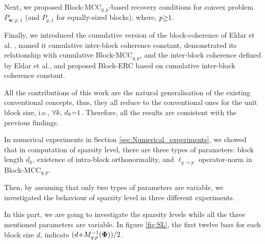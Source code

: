 Next, we proposed Block-MCC$_{q,p}$-based recovery conditions for convex problem $P_{\boldsymbol{w};p,1}$ (and $P_{p,1}$ for equally-sized blocks), where, $p {\geq} 1$.


Finally, we introduced the cumulative version of the block-coherence of Eldar et al. \cite{Eldar2009b}, 
named it cumulative inter-block coherence constant, 
demonstrated its relationship with cumulative Block-MCC$_{q,p}$, and 
the inter-block coherence defined by Eldar et al., 
and proposed Block-ERC based on cumulative inter-block coherence constant.

All the contributions of this work are the natural generalisation of the existing conventional concepts, thus, they all reduce to the conventional ones for the unit block size, i.e., $\forall k, \, d_k {=} 1$.
Therefore, all the results are consistent with the previous findings.

In numerical experiments in Section \ref{sec:Numerical_experiments}, we showed that in computation of sparsity level, there are three types of parameters: block length $d_k$, existence of intra-block orthonormality, and $\ell_{q {\to} p}$ operator-norm in Block-MCC$_{q,p}$.

Then, by assuming that only two types of parameters are variable, we investigated the behaviour of sparsity level in three different experiments.

In this part, we are going to investigate the sparsity levels while all the three mentioned parameters are variable.
In figure \ref{fig:SL}, the first twelve bars for each block size $d$, indicate $(d {+} M^{-1}_{q,p}(\boldsymbol{\Phi}))/2$.
\iffalse 
for the most pessimistic 
case, following Corollary \ref{crl:BERC-BMIC}.
\fi

